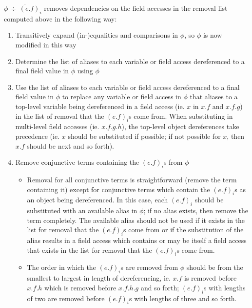 \documentclass {article}
\newcommand{\fphi}{\widehat{\phi}}
\begin{document}
$\phi \overline{\ \div \ (e.f)_i}$ removes dependencies on the field accesses in the removal list computed above in the following way:
\begin{enumerate}
\item Transitively expand (in-)equalities and comparisons in $\phi$, so $\phi$ is now modified in this way
\item Determine the list of aliases to each variable or field access dereferenced to a final field value in $\phi$ using $\phi$
\item Use the list of aliases to each variable or field access dereferenced to a final field value in $\phi$ to replace any variable or field access in $\phi$ that aliases to a top-level variable being dereferenced in a field access (ie. $x$ in $x.f$ and $x.f.g$) in the list of removal that the $(e.f)_i$s come from. When substituting in multi-level field accesses (ie. $x.f.g.h$), the top-level object dereferences take precedence (ie. $x$ should be substituted if possible; if not possible for $x$, then $x.f$ should be next and so forth).
\item Remove conjunctive terms containing the $(e.f)_i$s from $\phi$
	\begin{itemize}
	\item Removal for all conjunctive terms is straightforward (remove the term containing it) except for conjunctive terms which contain the $(e.f)_i$s as an object being dereferenced. In this case, each $(e.f)_i$ should be substituted with an available alias in $\phi$; if no alias exists, then remove the term completely. The available alias should not be used if it exists in the list for removal that the $(e.f)_i$s come from or if the substitution of the alias results in a field access which contains or may be itself a field access that exists in the list for removal that the $(e.f)_i$s come from.
	\item The order in which the $(e.f)_i$s are removed from $\phi$ should be from the smallest to largest in length of dereferencing, ie. $x.f$ is removed before $x.f.h$ which is removed before $x.f.h.g$ and so forth; $(e.f)_i$s with lengths of two are removed before $(e.f)_i$s with lengths of three and so forth.
	\end{itemize}
\end{enumerate}


\end{document}

